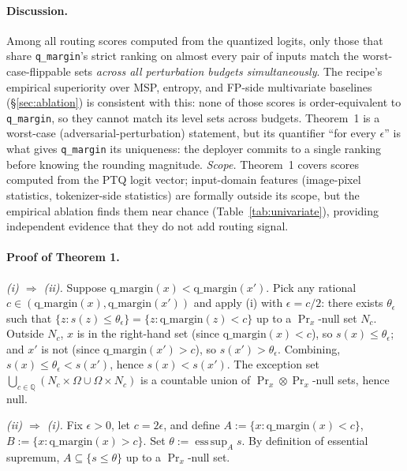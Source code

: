 \documentclass{article}
\newcommand{\ptq}{\textsc{PTQ}\xspace}
\begin{document}
\paragraph{Discussion.}
Among all routing scores computed from the quantized logits, only those that share \texttt{q\_margin}'s strict ranking on almost every pair of inputs match the worst-case-flippable sets \emph{across all perturbation budgets simultaneously}. The recipe's empirical superiority over MSP, entropy, and FP-side multivariate baselines (\S\ref{sec:ablation}) is consistent with this: none of those scores is order-equivalent to \texttt{q\_margin}, so they cannot match its level sets across budgets. Theorem~1 is a worst-case (adversarial-perturbation) statement, but its quantifier ``for every $\epsilon$'' is what gives \texttt{q\_margin} its uniqueness: the deployer commits to a single ranking before knowing the rounding magnitude. \emph{Scope.} Theorem~1 covers scores computed from the \ptq{} logit vector; input-domain features (image-pixel statistics, tokenizer-side statistics) are formally outside its scope, but the empirical ablation finds them near chance (Table~\ref{tab:univariate}), providing independent evidence that they do not add routing signal.

\paragraph{Proof of Theorem 1.}
\emph{(i) $\Rightarrow$ (ii).} Suppose $\mathrm{q\_margin}(x) < \mathrm{q\_margin}(x')$. Pick any rational $c \in (\mathrm{q\_margin}(x), \mathrm{q\_margin}(x'))$ and apply (i) with $\epsilon = c/2$: there exists $\theta_\epsilon$ such that $\{z : s(z) \leq \theta_\epsilon\} = \{z : \mathrm{q\_margin}(z) < c\}$ up to a $\Pr_x$-null set $N_c$. Outside $N_c$, $x$ is in the right-hand set (since $\mathrm{q\_margin}(x) < c$), so $s(x) \leq \theta_\epsilon$; and $x'$ is not (since $\mathrm{q\_margin}(x') > c$), so $s(x') > \theta_\epsilon$. Combining, $s(x) \leq \theta_\epsilon < s(x')$, hence $s(x) < s(x')$. The exception set $\bigcup_{c \in \mathbb Q} (N_c \times \Omega \cup \Omega \times N_c)$ is a countable union of $\Pr_x \otimes \Pr_x$-null sets, hence null.

\emph{(ii) $\Rightarrow$ (i).} Fix $\epsilon > 0$, let $c = 2\epsilon$, and define $A := \{x : \mathrm{q\_margin}(x) < c\}$, $B := \{x : \mathrm{q\_margin}(x) > c\}$. Set $\theta := \operatorname*{ess\,sup}_A s$. By definition of essential supremum, $A \subseteq \{s \leq \theta\}$ up to a $\Pr_x$-null set.
\end{document}

